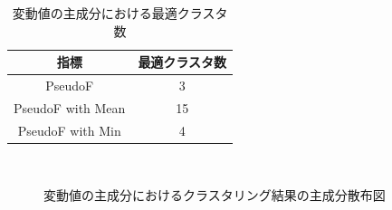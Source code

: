 \documentclass[a4j]{jarticle}
\begin{document}
\begin{table}[tb]
\centering
\caption{変動値の主成分における最適クラスタ数}
\label{diff_compPseudoFresult}
\begin{tabular}{|c|c|}
\hline
指標&最適クラスタ数\\
\hline
PseudoF&3\\
\hline
PseudoF with Mean&15\\
\hline
PseudoF with Min&4\\
\hline
\end{tabular}
\end{table}

\begin{figure}[tb]
\begin{center}
~
\\
\caption{変動値の主成分におけるクラスタリング結果の主成分散布図}
\label{diff_compPseudoFresultPlot}
\end{center}
\end{figure}
\end{document}
